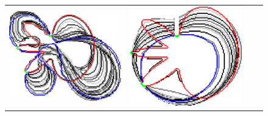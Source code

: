 \begin{figure}
\begin{tabular}{cccc}
\includegraphics[scale=0.2]{figures/chapter9/constrained-elastica/localsearch/flower-2/len_pen-0.0002/radius-15/nc-4/h1.0/summary.pdf} &
\includegraphics[scale=0.25]{figures/chapter9/constrained-elastica/graphflow/flower-2/len_pen-0.002/radius-15/N-1/h1.0/summary.pdf} &

\end{tabular}
\end{figure}
